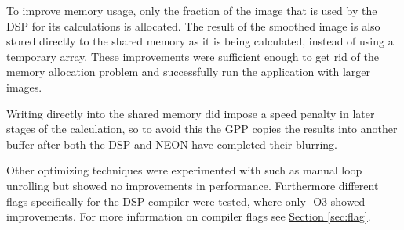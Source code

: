 To improve memory usage, only the fraction of the image that is used by the DSP for its calculations is allocated. The result of the smoothed image is also stored directly to the shared memory as it is being calculated, instead of using a temporary array. These improvements were sufficient enough to get rid of the memory allocation problem and successfully run the application with larger images.

Writing directly into the shared memory did impose a speed penalty in later stages of the calculation, so to avoid this the GPP copies the results into another buffer after both the DSP and NEON have completed their blurring.

Other optimizing techniques were experimented with such as manual loop unrolling but showed no improvements in performance. Furthermore different flags specifically for the DSP compiler were tested, where only -O3 showed improvements. For more information on compiler flags see \hyperref[sec:flag]{Section \ref{sec:flag}}.